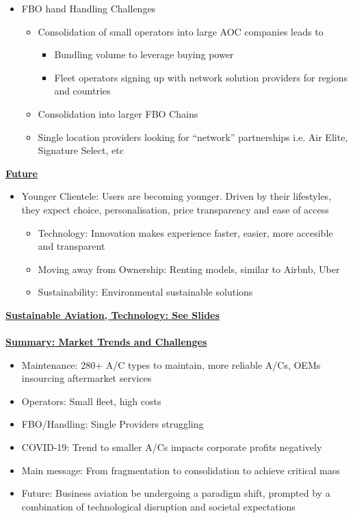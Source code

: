 \documentclass[9pt, landscape, fleqn]{scrartcl}
\begin{document}
\begin{multicols*}{3}
\begin{itemize}
\begin{itemize}
    \end{itemize}
    \item FBO hand Handling Challenges 
    \begin{itemize}
        \item Consolidation of small operators into large AOC companies leads to
        \begin{itemize}
            \item Bundling volume to leverage buying power
            \item Fleet operators signing up with network solution providers for
            regions and countries
        \end{itemize}
        \item Consolidation into larger FBO Chains 
        \item Single location providers looking for “network” partnerships i.e. Air Elite, Signature Select, etc
    \end{itemize}
\end{itemize}
\underline{\textbf{Future}}
\begin{itemize}
    \item Younger Clientele: Users are becoming younger. Driven by their lifestyles, they expect choice, personalisation, price transparency and ease of access
    \begin{itemize}
        \item Technology: Innovation makes experience faster, easier, more accesible and transparent
        \item Moving away from Ownership: Renting models, similar to Airbnb, Uber 
        \item Sustainability: Environmental sustainable solutions 
    \end{itemize}
\end{itemize}
\underline{\textbf{Sustainable Aviation, Technology: See Slides}} \\ \\ 
\underline{\textbf{Summary: Market Trends and Challenges}}
\begin{itemize}
    \item Maintenance: 280+ A/C types to maintain, more reliable A/Cs, OEMs insourcing aftermarket services 
    \item Operators: Small fleet, high costs 
    \item FBO/Handling: Single Providers struggling 
    \item COVID-19: Trend to smaller A/Cs impacts corporate profits negatively 
    \item Main message: From fragmentation to consolidation to achieve critical mass 
    \item Future: Business aviation be undergoing a paradigm shift, prompted by a combination of technological disruption and societal expectations
\end{itemize}
\newpage

\end{multicols*}
\end{document}
